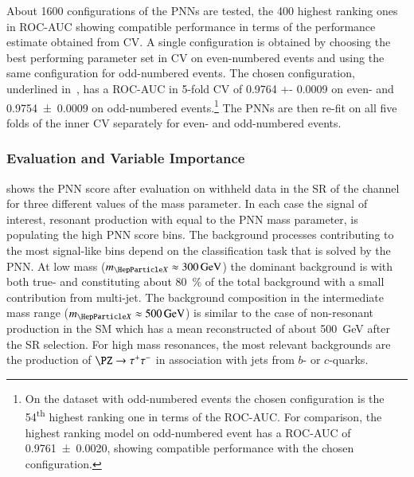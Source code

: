 About 1600 configurations of the PNNs are tested, the 400 highest ranking ones
in ROC-AUC showing compatible performance in terms of the performance estimate
obtained from CV. A single configuration is obtained by choosing the best
performing parameter set in CV on even-numbered events and using the same
configuration for odd-numbered events. The chosen configuration, underlined
in~, has a ROC-AUC in 5-fold CV of \num{0.9764
  +- 0.0009} on even- and \num{0.9754 +- 0.0009} on odd-numbered
events.\footnote{On the dataset with odd-numbered events the chosen
  configuration is the 54\textsuperscript{th} highest ranking one in terms of
  the ROC-AUC. For comparison, the highest ranking model on odd-numbered event
  has a ROC-AUC of \num{0.9761 +- 0.0020}, showing compatible performance with
  the chosen configuration.} The PNNs are then re-fit on all five folds of the
inner CV separately for even- and odd-numbered events.

\subsubsection{Evaluation and Variable Importance}

 shows the PNN score after evaluation on
withheld data in the SR of the \hadhad channel for three
different values of the mass parameter. In each case the signal of
interest, resonant \HH production with \mX equal to the PNN mass
parameter, is populating the high PNN score bins. The background
processes contributing to the most signal-like bins depend on the
classification task that is solved by the PNN. At low mass
($\mX \approx \SI{300}{\GeV}$) the dominant background is \ttbar with
both true- and \faketauhadvis constituting about \SI{80}{\percent} of
the total background with a small contribution from multi-jet.  The
background composition in the intermediate mass range
($\mX \approx \SI{500}{\GeV}$) is similar to the case of non-resonant
\HH production in the SM which has a mean reconstructed \mHH of about
\SI{500}{\GeV} after the SR selection. For high mass
resonances, the most relevant backgrounds are the production of
$\PZ \to \tautau$ in association with jets from $b$- or $c$-quarks.

